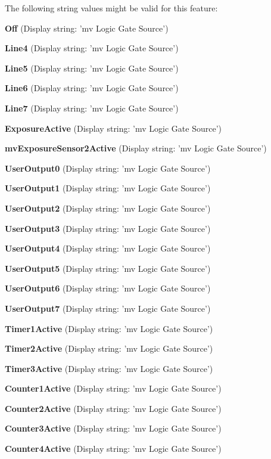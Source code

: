 The following string values might be valid for this feature\+:
\begin{DoxyItemize}
\item {\bfseries Off} (Display string\+: 'mv Logic Gate Source')
\item {\bfseries Line4} (Display string\+: 'mv Logic Gate Source')
\item {\bfseries Line5} (Display string\+: 'mv Logic Gate Source')
\item {\bfseries Line6} (Display string\+: 'mv Logic Gate Source')
\item {\bfseries Line7} (Display string\+: 'mv Logic Gate Source')
\item {\bfseries Exposure\+Active} (Display string\+: 'mv Logic Gate Source')
\item {\bfseries mv\+Exposure\+Sensor2\+Active} (Display string\+: 'mv Logic Gate Source')
\item {\bfseries User\+Output0} (Display string\+: 'mv Logic Gate Source')
\item {\bfseries User\+Output1} (Display string\+: 'mv Logic Gate Source')
\item {\bfseries User\+Output2} (Display string\+: 'mv Logic Gate Source')
\item {\bfseries User\+Output3} (Display string\+: 'mv Logic Gate Source')
\item {\bfseries User\+Output4} (Display string\+: 'mv Logic Gate Source')
\item {\bfseries User\+Output5} (Display string\+: 'mv Logic Gate Source')
\item {\bfseries User\+Output6} (Display string\+: 'mv Logic Gate Source')
\item {\bfseries User\+Output7} (Display string\+: 'mv Logic Gate Source')
\item {\bfseries Timer1\+Active} (Display string\+: 'mv Logic Gate Source')
\item {\bfseries Timer2\+Active} (Display string\+: 'mv Logic Gate Source')
\item {\bfseries Timer3\+Active} (Display string\+: 'mv Logic Gate Source')
\item {\bfseries Counter1\+Active} (Display string\+: 'mv Logic Gate Source')
\item {\bfseries Counter2\+Active} (Display string\+: 'mv Logic Gate Source')
\item {\bfseries Counter3\+Active} (Display string\+: 'mv Logic Gate Source')
\item {\bfseries Counter4\+Active} (Display string\+: 'mv Logic Gate Source')

\end{DoxyItemize}
